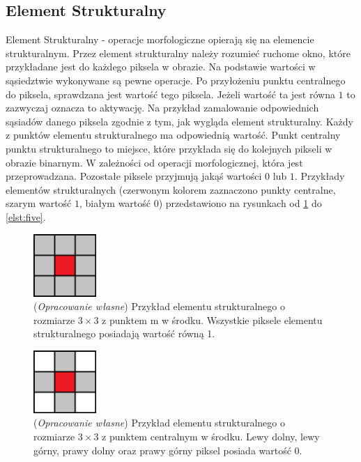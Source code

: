 \documentclass{article}
\begin{document}
        \subsection{Element Strukturalny}
        {
            \label{sec:element-strukturalny}
            \Large
            \justifying
            \quad
            Element Strukturalny - operacje morfologiczne opierają się na elemencie strukturalnym.
            Przez element strukturalny należy rozumieć ruchome okno, które przykładane jest do każdego piksela w obrazie.
            Na podstawie wartości w sąsiedztwie wykonywane są pewne operacje.
            Po przyłożeniu punktu centralnego do piksela, sprawdzana jest wartość tego piksela.
            Jeżeli wartość ta jest równa \(1\) to zazwyczaj oznacza to aktywację.
            Na przykład zamalowanie odpowiednich sąsiadów danego piksela zgodnie z tym, jak wygląda element strukturalny.
            Każdy z punktów elementu strukturalnego ma odpowiednią wartość.
            Punkt centralny punktu strukturalnego to miejsce, które przykłada się do kolejnych pikseli w obrazie binarnym.
            W zależności od operacji morfologicznej, która jest przeprowadzana.
            Pozostałe piksele przyjmują jakąś wartości \(0\) lub \(1\).
            Przykłady elementów strukturalnych (czerwonym kolorem zaznaczono punkty centralne, szarym wartość \(1\), białym wartość \(0\)) przedstawiono na rysunkach od \ref{elst:one} do \ref{elst:five}.
        }
        \begin{figure}[H]
            \captionsetup{margin=1.5cm}
            \centering
            \includegraphics[width=90px]{element_strukturalny_1.png}
            \caption
            {
                (\textit{Opracowanie własne}) Przykład elementu strukturalnego o rozmiarze \(3 \times 3\) z punktem m w środku.
                Wszystkie piksele elementu strukturalnego posiadają wartość równą 1.
            }
            \label{elst:one}
        \end{figure}

        \begin{figure}[H]
            \captionsetup{margin=1.5cm}
            \centering
            \includegraphics[width=90px]{element_strukturalny_2.png}
            \caption
            {
                (\textit{Opracowanie własne}) Przykład elementu strukturalnego o rozmiarze \(3 \times 3\) z punktem centralnym w środku.
                Lewy dolny, lewy górny, prawy dolny oraz prawy górny piksel posiada wartość 0.
            }
            \label{elst:two}
        \end{figure}
\end{document}

